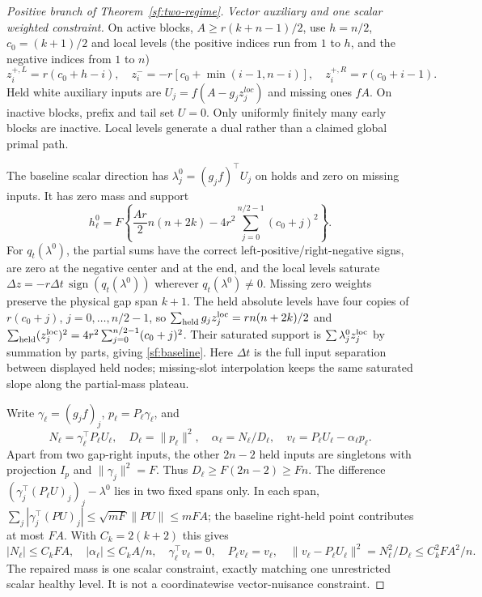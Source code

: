 \documentclass[journal]{IEEEtran}
\begin{document}
\begin{proof}[Positive branch of Theorem~\ref{sf:two-regime}]
\par\smallskip\noindent\textit{Vector auxiliary and one scalar weighted constraint.}\enspace 
On active blocks, $A\ge r(k+n-1)/2$, use $h=n/2$, $c_0=(k+1)/2$ and local levels (the positive indices run from $1$ to $h$,
and the negative indices from $1$ to $n$)
\[
z_i^{+,L}=r(c_0+h-i),\quad
z_i^-=-r[c_0+\min(i-1,n-i)],\quad
z_i^{+,R}=r(c_0+i-1).
\]
Held white auxiliary inputs are $U_j=f(A-g_jz_j^{loc})$ and missing ones $fA$.
On inactive blocks, prefix and tail set $U=0$.
Only uniformly finitely many early blocks are inactive.
Local levels generate a dual rather than a claimed global primal path.

The baseline scalar direction has $\lambda_j^0=(g_jf)^\top U_j$ on holds
and zero on missing inputs. It has zero mass and support
\begin{equation}\label{sf:baseline}
h_\ell^0=F\left\{\frac{Ar}{2}n(n+2k)
-4r^2\sum_{j=0}^{n/2-1}(c_0+j)^2\right\}.
\end{equation}
For $q_t(\lambda^0)$, the partial sums have the correct left-positive/right-negative signs,
are zero at the negative center and at the end, and the local levels
saturate $\Delta z=-r\Delta t\,\operatorname{sign}(q_t(\lambda^0))$ wherever $q_t(\lambda^0)\ne0$.
Missing zero weights preserve the physical gap span $k+1$.
The held absolute levels have four copies of
$r(c_0+j)$, $j=0,\ldots,n/2-1$, so
$\sum_{\rm held}g_jz_j^{\rm loc}=rn(n+2k)/2$ and
$\sum_{\rm held}(z_j^{\rm loc})^2=4r^2\sum_{j=0}^{n/2-1}(c_0+j)^2$.
Their saturated support is $\sum\lambda_j^0z_j^{\rm loc}$ by summation
by parts, giving \eqref{sf:baseline}. Here $\Delta t$ is the full input
separation between displayed held nodes; missing-slot interpolation keeps
the same saturated slope along the partial-mass plateau.

Write $\gamma_\ell=(g_jf)_j$, $p_\ell=P_\ell \gamma_\ell$, and
\[
N_\ell=\gamma_\ell^\top P_\ell U_\ell,\quad
D_\ell=\|p_\ell\|^2,\quad \alpha_\ell=N_\ell/D_\ell,\quad
v_\ell=P_\ell U_\ell-\alpha_\ell p_\ell .
\]
Apart from two gap-right inputs, the other $2n-2$ held inputs are singletons
with projection $I_p$ and $\|\gamma_j\|^2=F$.
Thus $D_\ell\ge F(2n-2)\ge Fn$.
The difference $(\gamma_j^\top(P_\ell U)_j)_j-\lambda^0$ lies in two fixed
spans only. In each span,
$\sum_j|\gamma_j^\top(PU)_j|\le\sqrt{mF}\|PU\|\le mFA$;
the baseline right-held point contributes at most $FA$.
With $C_k=2(k+2)$ this gives
\[
|N_\ell|\le C_kFA,\quad |\alpha_\ell|\le C_kA/n,\quad
\gamma_\ell^\top v_\ell=0,\quad P_\ell v_\ell=v_\ell,\quad
\|v_\ell-P_\ell U_\ell\|^2=N_\ell^2/D_\ell\le C_k^2FA^2/n .
\]
The repaired mass is one scalar constraint, exactly matching one unrestricted
scalar healthy level. It is not a coordinatewise vector-nuisance constraint.


\end{proof}
\end{document}

